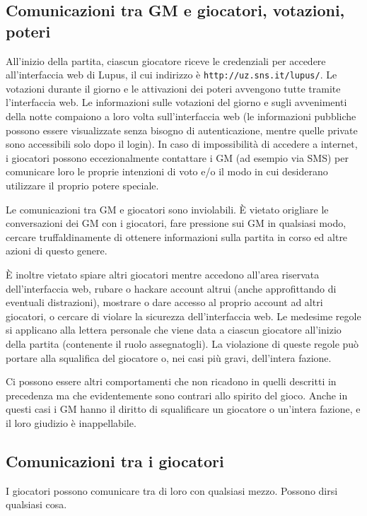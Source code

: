 \documentclass[a4paper,10pt]{article}
\begin{document}
\subsection{Comunicazioni tra GM e giocatori, votazioni, poteri}

All'inizio della partita, ciascun giocatore riceve le credenziali per accedere all'interfaccia web di Lupus, il cui indirizzo è \verb|http://uz.sns.it/lupus/|.
Le votazioni durante il giorno e le attivazioni dei poteri avvengono tutte tramite l'interfaccia web. Le informazioni sulle votazioni del giorno e sugli avvenimenti della notte compaiono a loro volta sull'interfaccia web (le informazioni pubbliche possono essere visualizzate senza bisogno di autenticazione, mentre quelle private sono accessibili solo dopo il login). In caso di impossibilità di accedere a internet, i giocatori possono eccezionalmente contattare i GM (ad esempio via SMS) per comunicare loro le proprie intenzioni di voto e/o il modo in cui desiderano utilizzare il proprio potere speciale.

Le comunicazioni tra GM e giocatori sono inviolabili. È vietato origliare le conversazioni dei GM con i giocatori, fare pressione sui GM in qualsiasi modo, cercare truffaldinamente di ottenere informazioni sulla partita in corso ed altre azioni di questo genere.

È inoltre vietato spiare altri giocatori mentre accedono all'area riservata dell'interfaccia web, rubare o hackare account altrui (anche approfittando di eventuali distrazioni), mostrare o dare accesso al proprio account ad altri giocatori, o cercare di violare la sicurezza dell'interfaccia web. Le medesime regole si applicano alla lettera personale che viene data a ciascun giocatore all'inizio della partita (contenente il ruolo assegnatogli). La violazione di queste regole può portare alla squalifica del giocatore o, nei casi più gravi, dell'intera fazione.

Ci possono essere altri comportamenti che non ricadono in quelli descritti in precedenza ma che evidentemente sono contrari allo spirito del gioco. Anche in questi casi i GM hanno il diritto di squalificare un giocatore o un'intera fazione, e il loro giudizio è inappellabile.


\subsection{Comunicazioni tra i giocatori}

I giocatori possono comunicare tra di loro con qualsiasi mezzo. Possono dirsi qualsiasi cosa.
\end{document}
